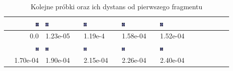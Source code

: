 \documentclass[a4paper,11pt]{article}
\begin{document}
\begin{enumerate}
\begin{table}[htb]
\begin{tabular}{|r|l|l|l|l|l|l|l|l|l|}
  \hline 
  \includegraphics[width=0.1\textwidth]{./img/rot0.png} &  \includegraphics[width=0.1\textwidth]{./img/rot1.png} &  \includegraphics[width=0.1\textwidth]{./img/rot2.png} &  \includegraphics[width=0.1\textwidth]{./img/rot3.png} &  \includegraphics[width=0.1\textwidth]{./img/rot4.png}  \\
  \hline
  0.0 & 1.23e-05 & 1.19e-4 & 1.58e-04 & 1.52e-04  \\
  \hline
 \includegraphics[width=0.1\textwidth]{./img/rot5.png} &  \includegraphics[width=0.1\textwidth]{./img/rot6.png} &  \includegraphics[width=0.1\textwidth]{./img/rot7.png} &  \includegraphics[width=0.1\textwidth]{./img/rot8.png} 
&  \includegraphics[width=0.1\textwidth]{./img/rot9.png} \\
  \hline
1.70e-04 &1.90e-04 & 2.15e-04 & 2.26e-04 & 2.40e-04 \\
\hline
\end{tabular} 
\caption{Kolejne próbki oraz ich dystans od pierwszego fragmentu}
\end{table}
\end{enumerate}
\end{document}
